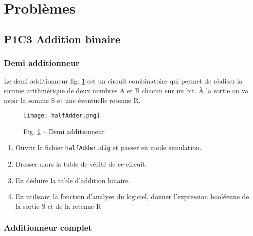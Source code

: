 \documentclass[11pt,french]{article}
\makeatletter
\def\maxwidth{\ifdim\Gin@nat@width>\linewidth\linewidth
    \else\Gin@nat@width\fi}
\let\Oldincludegraphics\includegraphics
\renewcommand{\includegraphics}[1]{\Oldincludegraphics[width=.8\maxwidth]{#1}}
\makeatother
\begin{document}
    \hypertarget{probluxe8mes}{%
\section{Problèmes}\label{probluxe8mes}}

\hypertarget{p1c3-addition-binaire}{%
\subsection{P1C3 Addition binaire}\label{p1c3-addition-binaire}}

\hypertarget{demi-additionneur}{%
\subsubsection{Demi additionneur}\label{demi-additionneur}}

Le demi additionneur fig. \ref{fig:halfAdder} est un circuit combinatoire qui permet de réaliser
la somme arithmétique de deux nombres A et B chacun sur un bit. \`A la sortie on va avoir la somme S et une éventuelle retenue R.
\begin{figure}[h]
	\begin{center}
		\texttt{[image: halfAdder.png]}
	\end{center}
	\caption{Fig. \ref{fig:halfAdder} -- Demi additionneur}
	\label{fig:halfAdder}
\end{figure}
\begin{enumerate}
\item Ouvrir le fichier \texttt{halfAdder.dig} et passer en mode simulation.
\item Dresser alors la table de vérité de ce circuit.
\item En déduire la table d'addition binaire.
\item En utilisant la fonction d'analyse du logiciel, donner l'expression
booléenne de la sortie S et de la retenue R
\end{enumerate}

\hypertarget{additionneur-complet}{%
\subsubsection{Additionneur complet}\label{additionneur-complet}}
\end{document}

